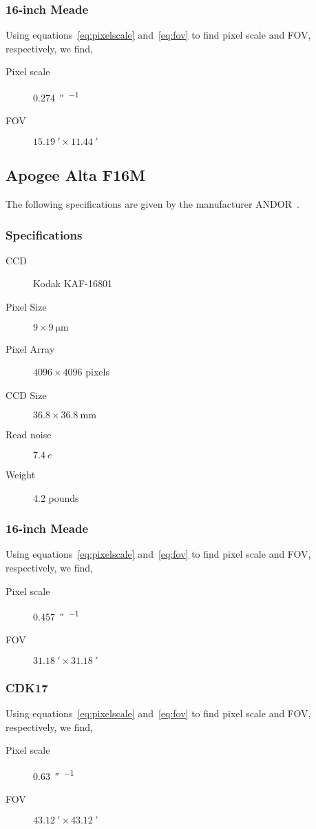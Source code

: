 \subsubsection{16-inch Meade}
Using equations~\ref{eq:pixelscale} and~\ref{eq:fov} to find pixel scale and FOV, respectively, we find, 
\begin{description}
    \item[Pixel scale] \SI{0.274}{\arcsecond\per{}}
    \item[FOV] $\SI{15.19}{\arcminute} \times \SI{11.44}{\arcminute}$
\end{description}

\subsection{Apogee Alta F16M}
The following specifications are given by the manufacturer ANDOR~\cite{apogee}.
\subsubsection{Specifications}
\begin{description}
    \item[CCD] Kodak KAF-16801
    \item[Pixel Size] $9 \times \SI{9}{\micro\meter}$
    \item[Pixel Array] $4096 \times 4096$ pixels
    \item[CCD Size] $36.8 \times \SI{36.8}{\milli\meter}$
    \item[Read noise] $\SI{7.4}{\elementarycharge}$
    \item[Weight] 4.2 pounds
\end{description}


\subsubsection{16-inch Meade}
Using equations~\ref{eq:pixelscale} and~\ref{eq:fov} to find pixel scale and FOV, respectively, we find, 
\begin{description}
    \item[Pixel scale] \SI{0.457}{\arcsecond\per{}}
    \item[FOV] $\SI{31.18}{\arcminute} \times \SI{31.18}{\arcminute}$
\end{description}

\subsubsection{CDK17}
Using equations~\ref{eq:pixelscale} and~\ref{eq:fov} to find pixel scale and FOV, respectively, we find, 
\begin{description}
    \item[Pixel scale] \SI{0.63}{\arcsecond\per{}}
    \item[FOV] $\SI{43.12}{\arcminute} \times \SI{43.12}{\arcminute}$
\end{description}

